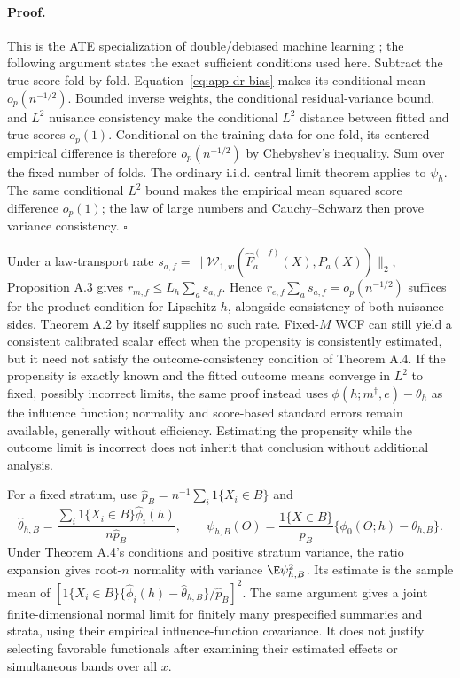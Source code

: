 \paragraph{Proof.}
This is the ATE specialization of double/debiased machine learning \citep[Theorem 5.1]{chernozhukov2018double}; the following argument states the exact sufficient conditions used here. Subtract the true score fold by fold. Equation~\eqref{eq:app-dr-bias} makes its conditional mean $o_p(n^{-1/2})$. Bounded inverse weights, the conditional residual-variance bound, and $L^2$ nuisance consistency make the conditional $L^2$ distance between fitted and true scores $o_p(1)$. Conditional on the training data for one fold, its centered empirical difference is therefore $o_p(n^{-1/2})$ by Chebyshev's inequality. Sum over the fixed number of folds. The ordinary i.i.d. central limit theorem applies to $\psi_h$. The same conditional $L^2$ bound makes the empirical mean squared score difference $o_p(1)$; the law of large numbers and Cauchy--Schwarz then prove variance consistency. $\square$

Under a law-transport rate $s_{a,f}=\|\mathcal W_{1,w}(\widehat F_a^{(-f)}(X),P_a(X))\|_2$, Proposition A.3 gives $r_{m,f}\leq L_h\sum_a s_{a,f}$. Hence $r_{e,f}\sum_a s_{a,f}=o_p(n^{-1/2})$ suffices for the product condition for Lipschitz $h$, alongside consistency of both nuisance sides. Theorem A.2 by itself supplies no such rate. Fixed-$M$ WCF can still yield a consistent calibrated scalar effect when the propensity is consistently estimated, but it need not satisfy the outcome-consistency condition of Theorem A.4. If the propensity is exactly known and the fitted outcome means converge in $L^2$ to fixed, possibly incorrect limits, the same proof instead uses $\phi(h;m^\dagger,e)-\theta_h$ as the influence function; normality and score-based standard errors remain available, generally without efficiency. Estimating the propensity while the outcome limit is incorrect does not inherit that conclusion without additional analysis.

For a fixed stratum, use $\widehat p_B=n^{-1}\sum_i1\{X_i\in B\}$ and
\[
 \widehat\theta_{h,B}=\frac{\sum_i1\{X_i\in B\}\widehat\phi_i(h)}{n\widehat p_B},\qquad
 \psi_{h,B}(O)=\frac{1\{X\in B\}}{p_B}\{\phi_0(O;h)-\theta_{h,B}\}.
\]
Under Theorem A.4's conditions and positive stratum variance, the ratio expansion gives root-$n$ normality with variance $\E\psi_{h,B}^2$. Its estimate is the sample mean of $[1\{X_i\in B\}\{\widehat\phi_i(h)-\widehat\theta_{h,B}\}/\widehat p_B]^2$. The same argument gives a joint finite-dimensional normal limit for finitely many prespecified summaries and strata, using their empirical influence-function covariance. It does not justify selecting favorable functionals after examining their estimated effects or simultaneous bands over all $x$.

